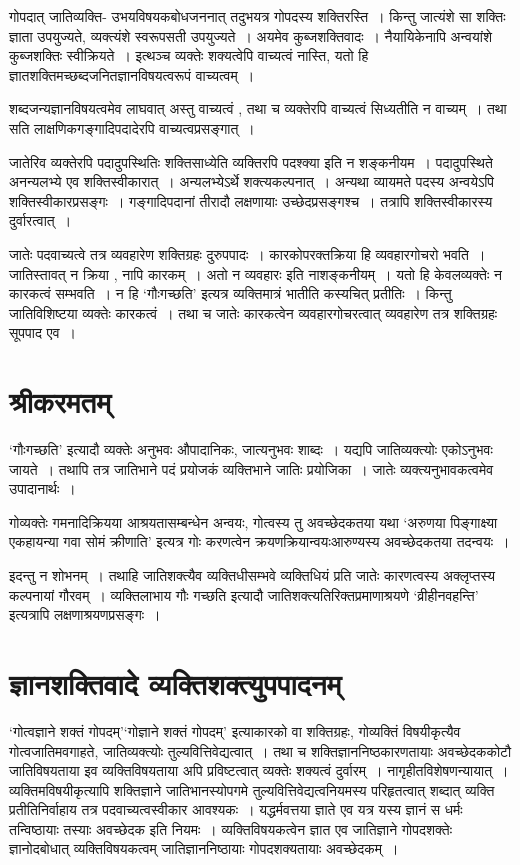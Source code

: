 {गोपदात् जातिव्यक्ति- उभयविषयकबोधजननात् तदुभयत्र गोपदस्य शक्तिरस्ति~। किन्तु जात्यंशे सा शक्तिः ज्ञाता उपयुज्यते, व्यक्त्यंशे स्वरूपसती उपयुज्यते~। अयमेव कुब्जशक्तिवादः~। नैयायिकेनापि अन्वयांशे कुब्जशक्तिः स्वीक्रियते~। इत्थञ्च व्यक्तेः शक्यत्वेपि वाच्यत्वं नास्ति, यतो हि ज्ञातशक्तिमच्छब्दजनितज्ञानविषयत्वरूपं वाच्यत्वम्~। 

शब्दजन्यज्ञानविषयत्वमेव लाघवात् अस्तु वाच्यत्वं , तथा च व्यक्तेरपि वाच्यत्वं       सिध्यतीति न वाच्यम्~। तथा सति लाक्षणिकगङ्गादिपदादेरपि वाच्यत्वप्रसङ्गात्~। 

जातेरिव व्यक्तेरपि पदादुपस्थितिः शक्तिसाध्येति व्यक्तिरपि पदश्क्या इति न शङ्कनीयम~। पदादुपस्थिते अनन्यलभ्ये एव शक्तिस्वीकारात्~। अन्यलभ्येऽर्थे शक्त्यकल्पनात्~। अन्यथा व्यायमते पदस्य अन्वयेऽपि शक्तिस्वीकारप्रसङ्गः~। गङ्गादिपदानां तीरादौ लक्षणायाः उच्छेदप्रसङ्गश्च~। तत्रापि शक्तिस्वीकारस्य दुर्वारत्वात्~। 

जातेः पदवाच्यत्वे तत्र व्यवहारेण  शक्तिग्रहः दुरुपपादः~। कारकोपरक्तक्रिया हि व्यवहारगोचरो भवति~। जातिस्तावत् न क्रिया , नापि कारकम्~। अतो न व्यवहारः इति नाशङ्कनीयम्~। यतो हि केवलव्यक्तेः न कारकत्वं सम्भवति~। न हि ‘गौःगच्छति’ इत्यत्र व्यक्तिमात्रं भातीति कस्यचित् प्रतीतिः~। किन्तु जातिविशिष्टया व्यक्तेः कारकत्वं~। तथा च जातेः कारकत्वेन व्यवहारगोचरत्वात् व्यवहारेण तत्र शक्तिग्रहः सूपपाद एव~। 

\section*{श्रीकरमतम्}

‘गौःगच्छति’ इत्यादौ व्यक्तेः अनुभवः औपादानिकः, जात्यनुभवः शाब्दः~। यद्यपि जातिव्यक्त्योः एकोऽनुभवः जायते~। तथापि तत्र जातिभाने पदं प्रयोजकं व्यक्तिभाने जातिः प्रयोजिका~। जातेः व्यक्त्यनुभावकत्वमेव उपादानार्थः~। 

गोव्यक्तेः गमनादिक्रियया आश्रयतासम्बन्धेन अन्वयः, गोत्वस्य तु अवच्छेदकतया यथा ‘अरुणया पिङ्गाक्ष्या एकहायन्या गवा सोमं क्रीणाति’ इत्यत्र गोः करणत्वेन क्रयणक्रियान्वयःआरुण्यस्य अवच्छेदकतया तदन्वयः~। 

इदन्तु न शोभनम्~। तथाहि जातिशक्त्यैव व्यक्तिधीसम्भवे व्यक्तिधियं प्रति जातेः कारणत्वस्य अक्लृप्तस्य कल्पनायां गौरवम्~। व्यक्तिलाभाय गौः गच्छति इत्यादौ जातिशक्त्यतिरिक्तप्रमाणाश्रयणे ‘व्रीहीनवहन्ति’ इत्यत्रापि लक्षणाश्रयणप्रसङ्गः~। 

\section*{ज्ञानशक्तिवादे व्यक्तिशक्त्युपपादनम्}

‘गोत्वज्ञाने शक्तं गोपदम्’‘गोज्ञाने शक्तं गोपदम्’ इत्याकारको वा शक्तिग्रहः, गोव्यक्तिं विषयीकृत्यैव गोत्वजातिमवगाहते, जातिव्यक्त्योः      तुल्यवित्तिवेद्यत्वात्~। तथा च शक्तिज्ञाननिष्ठकारणतायाः अवच्छेदककोटौ जातिविषयताया इव व्यक्तिविषयताया अपि प्रविष्टत्वात् व्यक्तेः शक्यत्वं दुर्वारम्~। नागृहीतविशेषणन्यायात्~। व्यक्तिमविषयीकृत्यापि शक्तिज्ञाने जातिभानस्योपगमे तुल्यवित्तिवेद्यत्वनियमस्य परिहृतत्वात् शब्दात् व्यक्ति प्रतीतिनिर्वाहाय तत्र पदवाच्यत्वस्वीकार आवश्यकः~। यद्धर्मवत्तया ज्ञाते एव यत्र यस्य ज्ञानं    स धर्मः तन्विष्ठायाः तस्याः अवच्छेदक इति नियमः~। व्यक्तिविषयकत्वेन ज्ञात एव जातिज्ञाने गोपदशक्तेः ज्ञानोदबोधात् व्यक्तिविषयकत्वम् जातिज्ञाननिष्ठायाः गोपदशक्यतायाः अवच्छेदकम्~। 

}
